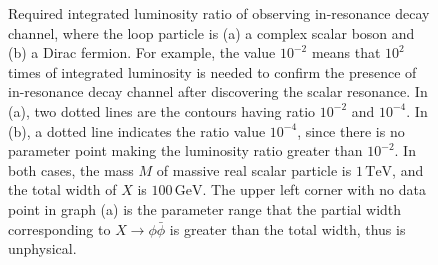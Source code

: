 \documentclass[11pt]{article}
\theoremstyle{definition}
\theoremstyle{remark}
\begin{document}
\begin{figure}[h]
		\caption{Required integrated luminosity ratio of observing in-resonance decay channel, where the loop particle is (a) a complex scalar boson and (b) a Dirac fermion. For example, the value $10^{-2}$ means that $10^{2}$ times of integrated luminosity is needed to confirm the presence of in-resonance decay channel after discovering the scalar resonance. In (a), two dotted lines are the contours having ratio $10^{-2}$ and $10^{-4}$. In (b), a dotted line indicates the ratio value $10^{-4}$, since there is no parameter point making the luminosity ratio greater than $10^{-2}$. In both cases, the mass $M$ of massive real scalar particle is $1\,\mathrm{TeV}$, and the total width of $X$ is $100\,\mathrm{GeV}$. The upper left corner with no data point in graph (a) is the parameter range that the partial width corresponding to $X\to\phi\bar{\phi}$ is greater than the total width, thus is unphysical.}
		\label{fig:luminosity_ratio_sf}
	\end{figure}
	
\end{document}
